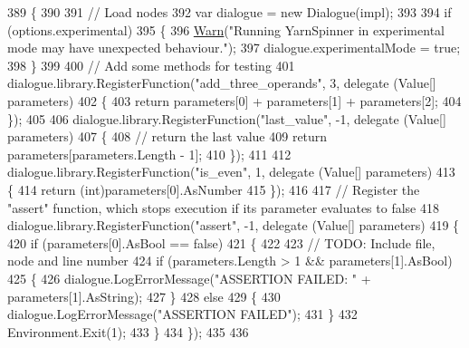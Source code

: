 \begin{DoxyCode}
389         \{
390 
391             \textcolor{comment}{// Load nodes}
392             var dialogue = \textcolor{keyword}{new} Dialogue(impl);
393 
394             \textcolor{keywordflow}{if} (options.experimental)
395             \{
396                 \hyperlink{a00195_a979bb6f049b6c5294f745a19e24ddd9d}{Warn}(\textcolor{stringliteral}{"Running YarnSpinner in experimental mode may have unexpected behaviour."});
397                 dialogue.experimentalMode = \textcolor{keyword}{true};
398             \}
399 
400             \textcolor{comment}{// Add some methods for testing}
401             dialogue.library.RegisterFunction(\textcolor{stringliteral}{"add\_three\_operands"}, 3, delegate (Value[] parameters)
402             \{
403                 \textcolor{keywordflow}{return} parameters[0] + parameters[1] + parameters[2];
404             \});
405 
406             dialogue.library.RegisterFunction(\textcolor{stringliteral}{"last\_value"}, -1, delegate (Value[] parameters)
407             \{
408                 \textcolor{comment}{// return the last value}
409                 \textcolor{keywordflow}{return} parameters[parameters.Length - 1];
410             \});
411 
412             dialogue.library.RegisterFunction(\textcolor{stringliteral}{"is\_even"}, 1, delegate (Value[] parameters)
413             \{
414                 \textcolor{keywordflow}{return} (\textcolor{keywordtype}{int})parameters[0].AsNumber %
415             \});
416 
417             \textcolor{comment}{// Register the "assert" function, which stops execution if its parameter evaluates to false}
418             dialogue.library.RegisterFunction(\textcolor{stringliteral}{"assert"}, -1, delegate (Value[] parameters)
419             \{
420                 \textcolor{keywordflow}{if} (parameters[0].AsBool == \textcolor{keyword}{false})
421                 \{
422 
423                     \textcolor{comment}{// TODO: Include file, node and line number}
424                     \textcolor{keywordflow}{if} (parameters.Length > 1 && parameters[1].AsBool)
425                     \{
426                         dialogue.LogErrorMessage(\textcolor{stringliteral}{"ASSERTION FAILED: "} + parameters[1].AsString);
427                     \}
428                     \textcolor{keywordflow}{else}
429                     \{
430                         dialogue.LogErrorMessage(\textcolor{stringliteral}{"ASSERTION FAILED"});
431                     \}
432                     Environment.Exit(1);
433                 \}
434             \});
435 
436 

\end{DoxyCode}
